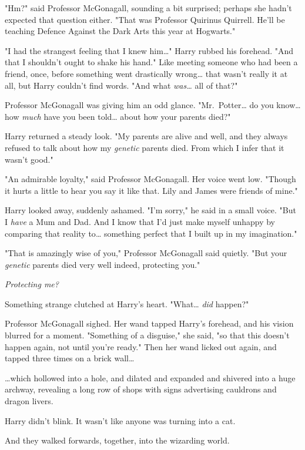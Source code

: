 "Hm?" said Professor McGonagall, sounding a bit surprised; perhaps she hadn't 
expected that question either. "That was Professor Quirinus Quirrell. He'll be 
teaching Defence Against the Dark Arts this year at Hogwarts."

"I had the strangest feeling that I knew him{\ldots}" Harry rubbed his 
forehead. "And that I shouldn't ought to shake his hand." Like meeting someone 
who had been a friend, once, before something went drastically wrong{\ldots} 
that wasn't really it at all, but Harry couldn't find words. "And what 
\emph{was{\ldots}} all of that?"

Professor McGonagall was giving him an odd glance. "Mr.~Potter{\ldots} do you 
know{\ldots} how \emph{much} have you been told{\ldots} about how your parents 
died?"

Harry returned a steady look. "My parents are alive and well, and they always 
refused to talk about how my \emph{genetic} parents died. From which I infer 
that it wasn't good."

"An admirable loyalty," said Professor McGonagall. Her voice went low. "Though 
it hurts a little to hear you say it like that. Lily and James were friends of 
mine."

Harry looked away, suddenly ashamed. "I'm sorry," he said in a small voice. 
"But I \emph{have} a Mum and Dad. And I know that I'd just make myself unhappy 
by comparing that reality to{\ldots} something perfect that I built up in my 
imagination."

"That is amazingly wise of you," Professor McGonagall said quietly. "But your 
\emph{genetic} parents died very well indeed, protecting you."

\emph{Protecting me?}

Something strange clutched at Harry's heart. "What{\ldots} \emph{did} happen?"

Professor McGonagall sighed. Her wand tapped Harry's forehead, and his vision 
blurred for a moment. "Something of a disguise," she said, "so that this 
doesn't happen again, not until you're ready." Then her wand licked out again, 
and tapped three times on a brick wall{\ldots}

{\ldots}which hollowed into a hole, and dilated and expanded and shivered into 
a huge archway, revealing a long row of shops with signs advertising cauldrons 
and dragon livers.

Harry didn't blink. It wasn't like anyone was turning into a cat.

And they walked forwards, together, into the wizarding world.


